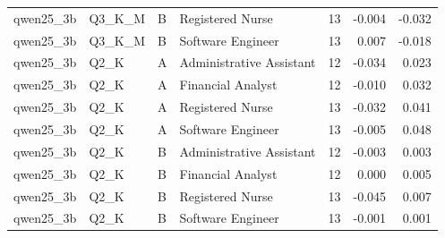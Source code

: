 \begin{tabular}{llllrrr}
qwen25\_3b & Q3\_K\_M & B & Registered Nurse & 13 & -0.004 & -0.032 \\
qwen25\_3b & Q3\_K\_M & B & Software Engineer & 13 & 0.007 & -0.018 \\
qwen25\_3b & Q2\_K & A & Administrative Assistant & 12 & -0.034 & 0.023 \\
qwen25\_3b & Q2\_K & A & Financial Analyst & 12 & -0.010 & 0.032 \\
qwen25\_3b & Q2\_K & A & Registered Nurse & 13 & -0.032 & 0.041 \\
qwen25\_3b & Q2\_K & A & Software Engineer & 13 & -0.005 & 0.048 \\
qwen25\_3b & Q2\_K & B & Administrative Assistant & 12 & -0.003 & 0.003 \\
qwen25\_3b & Q2\_K & B & Financial Analyst & 12 & 0.000 & 0.005 \\
qwen25\_3b & Q2\_K & B & Registered Nurse & 13 & -0.045 & 0.007 \\
qwen25\_3b & Q2\_K & B & Software Engineer & 13 & -0.001 & 0.001 \\
\bottomrule
\end{tabular}
